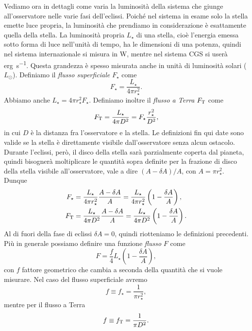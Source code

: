 Vediamo ora in dettagli come varia la luminosità della sistema che giunge
all'osservatore nelle varie fasi dell'eclissi. Poiché nel sistema in esame solo
la stella emette luce propria, la luminosità che prendiamo in considerazione è
esattamente quella della stella. La luminosità propria $L_\star$ di una stella,
cioè l'energia emessa sotto forma di luce nell'unità di tempo, ha le dimensioni
di una potenza, quindi nel sistema internazionale si misura in \si{\watt},
mentre nel sistema CGS si userà \si{erg\per \second}. Questa grandezza è spesso
misurata anche in unità di luminosità solari ($L_\odot$). Definiamo il
\emph{flusso superficiale} $F_\star$ come
\begin{equation}
    F_\star = \frac{L_\star}{4\pi r_\star^2}.
\end{equation}
Abbiamo anche $L_\star = 4\pi r_\star^2 F_\star$. Definiamo inoltre il
\emph{flusso a Terra} $F_{\textup{T}}$ come
\begin{equation}
  F_{\textup{T}} = \frac{L_\star}{4\pi D^2} = F_\star \frac{r_\star^2}{D^2},
\end{equation}
in cui $D$ è la distanza fra l'osservatore e la stella. Le definizioni fin qui
date sono valide se la stella è direttamente visibile dall'osservatore senza
alcun ostacolo. Durante l'eclissi, però, il disco della stella sarà parzialmente
coperta dal pianeta, quindi bisognerà moltiplicare le quantità sopra definite
per la frazione di disco della stella visibile all'osservatore, vale a dire
$(A - \delta A)/A$, con $A= \pi r_\star^2$. Dunque
\begin{align}
  F_\star &= \frac{L_\star}{4\pi r_\star^2} \frac{A - \delta A}{A} =
  \frac{L_\star}{4\pi r_\star^2} \left( 1 - \frac{\delta A}{A} \right), \\
  F_{\textup{T}} &= \frac{L_\star}{4\pi D^2} \frac{A - \delta A}{A} =
  \frac{L_\star}{4\pi D^2} \left( 1 - \frac{\delta A}{A} \right).
\end{align}
Al di fuori della fase di eclissi $\delta A = 0$, quindi riotteniamo le
definizioni precedenti. Più in generale possiamo definire una funzione
\emph{flusso} $F$ come
\begin{equation}
  F = \frac{f}{4} L_\star \left( 1 - \frac{\delta A}{A} \right),
\end{equation}
con $f$ fattore geometrico che cambia a seconda della quantità che si vuole
misurare. Nel caso del flusso superficiale avremo
\begin{equation}
  f \equiv f_\star = \frac{1}{\pi r_\star^2},
\end{equation}
mentre per il flusso a Terra
\begin{equation}
  f \equiv f_{\textup{T}} = \frac{1}{\pi D^2}.
\end{equation}

